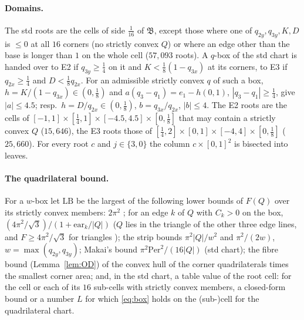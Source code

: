 \documentclass[11pt]{article}
\theoremstyle{remark}
\begin{document}
\paragraph{Domains.} The std roots are the cells of side $\frac1{16}$ of $\mathfrak B$, except those where one of
$q_{2y},q_{3y},K,D$ is $\le0$ at all $16$ corners (no strictly convex $Q$) or where an edge other than the base is longer
than $1$ on the whole cell ($57{,}093$ roots). A $q$-box of the std chart is handed over to E2 if $q_{3y}\ge\frac14$ on
it and $K<\frac18(1-q_{3x})$ at its corners, to E3 if $q_{2x}\ge\frac14$ and $D<\frac18q_{2x}$. For an admissible strictly
convex $q$ of such a box, $h=K/(1-q_{3x})\in(0,\frac18)$ and $a(q_3-q_1)=e_1-h(0,1)$, $|q_3-q_1|\ge\frac14$, give
$|a|\le4.5$; resp.\ $h=D/q_{2x}\in(0,\frac18)$, $b=q_{3x}/q_{2x}$, $|b|\le4$. The E2 roots are the cells of
$[-1,1]\times[\frac14,1]\times[-4.5,4.5]\times[0,\frac18]$ that may contain a strictly convex $Q$ ($15{,}646$), the E3
roots those of $[\frac14,2]\times[0,1]\times[-4,4]\times[0,\frac18]$ ($25{,}660$). For every root $c$ and $j\in\{3,0\}$
the column $c\times[0,1]^2$ is bisected into leaves.

\paragraph{The quadrilateral bound.} For a $w$-box let $\mathrm{LB}$ be the largest of the following lower bounds of
$F(Q)$ over its strictly convex members: $2\pi^2$ \cite{ps}; for an edge $k$ of $Q$ with $C_k>0$ on the box,
$(4\pi^2/\sqrt3)/(1+\mathrm{ear}_k/|Q|)$ ($Q$ lies in the triangle of the other three edge lines, and
$F\ge4\pi^2/\sqrt3$ for triangles \cite{ps}); the strip bounds $\pi^2|Q|/w^2$ and $\pi^2/(2w)$, $w=\max(q_{2y},q_{3y})$;
Makai's bound $\pi^2\mathrm{Per}^2/(16|Q|)$ \cite{makai} (std chart); the fibre bound (Lemma~\ref{lem:OD}) of the convex
hull of the corner quadrilaterals times the smallest corner area; and, in the std chart, a table value of the root
cell: for the cell or each of its $16$ sub-cells with strictly convex members, a closed-form bound or a number $L$ for
which \eqref{eq:box} holds on the (sub-)cell for the quadrilateral chart.
\end{document}
